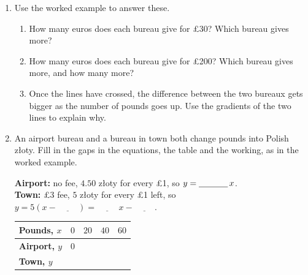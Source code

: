 \documentclass[12pt,a4paper]{article}
\newcommand{\ansline}[1][2.2cm]{\underline{\hspace{#1}}}
\newcommand{\zl}{z\l{}oty}
\begin{document}
\begin{enumerate}[resume]

\item Use the worked example to answer these.
\begin{enumerate}
  \item How many euros does each bureau give for \pounds30? Which bureau gives
        more?

        \vspace{4em}
  \item How many euros does each bureau give for \pounds200? Which bureau
        gives more, and how many more?

        \vspace{4em}
  \item Once the lines have crossed, the difference between the two bureaux
        gets bigger as the number of pounds goes up. Use the gradients of the
        two lines to explain why.

        \vspace{5em}
\end{enumerate}

\newpage

\item An airport bureau and a bureau in town both change pounds into Polish
\zl{}. Fill in the gaps in the equations, the table and the working, as in the
worked example.

\medskip
\textbf{Airport:} no fee, $4.50$ \zl{} for every \pounds1, so
$y=\ansline[1.2cm]\,x$.\\[4pt]
\textbf{Town:} \pounds3 fee, $5$ \zl{} for every \pounds1 left, so
$y=5(x-\ansline[1cm])=\ansline[1cm]\,x-\ansline[1cm]$.

\smallskip
\begin{center}
\begin{tabular}{|l|c|c|c|c|}
\hline
\textbf{Pounds, $x$} & $0$ & $20$ & $40$ & $60$\\
\hline
\textbf{Airport, $y$} & $0$ & \hspace{1.2cm} & \hspace{1.2cm} & \hspace{1.2cm}\\
\hline
\textbf{Town, $y$} & & & & \\
\hline
\end{tabular}
\end{center}


\end{enumerate}
\end{document}
